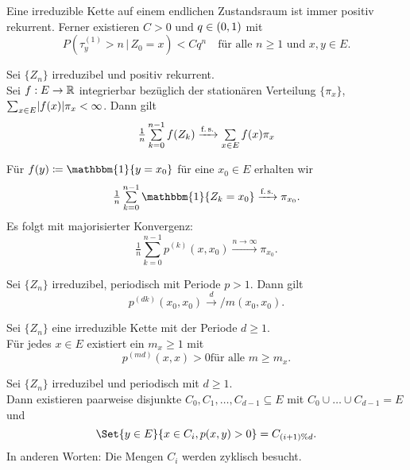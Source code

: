 \documentclass{cheat-sheet}
\newcommand{\ind}{\mathbbm{1}} %
\newcommand{\Defn}[1]{\textcolor{DefinitionColor}{#1}}
\begin{document}

\begin{satz}
  Eine irreduzible Kette auf einem endlichen Zustandsraum ist immer positiv rekurrent.
  Ferner existieren $C > 0$ und $q \in \left( 0, 1 \right)$ mit
  \[
    P(\tau_y^{(1)} > n \,|\, Z_0 = x) < C q^n
    \quad \text{für alle $n \geq 1$ und $x, y \in E$.}
  \]
\end{satz}

\begin{satz}
  Sei $\{ Z_n \}$ irreduzibel und positiv rekurrent. \\
  Sei $f : E \to \mathbb{R}$ integrierbar bezüglich der stationären Verteilung $\{ \pi_x \}$, \dh{} ${\sum}_{x \in E} \abs{f(x)} \pi_x < \infty$.
  Dann gilt
  \[
    \tfrac{1}{n} \sum_{k=0}^{n-1} f(Z_k) \xrightarrow{\text{f.\,s.}} \sum_{x \in E} f(x) \pi_x
  \]
\end{satz}

\begin{bsp}
  Für $f(y) \coloneqq \ind \{ y = x_0 \}$ für eine $x_0 \in E$ erhalten wir
  \[ \tfrac{1}{n} \sum_{k=0}^{n-1} \ind \{ Z_k = x_0 \} \xrightarrow{\text{f.\,s.}} \pi_{x_0}. \]
  Es folgt mit majorisierter Konvergenz:
  \[ \tfrac{1}{n} \sum_{k=0}^{n-1} p^{(k)}(x, x_0) \xrightarrow{n \to \infty} \pi_{x_0}. \]
\end{bsp}

\begin{bsp}
  Sei $\{ Z_n \}$ irreduzibel, periodisch mit Periode $p > 1$.
  Dann gilt
  \[
    p^{(dk)}(x_0, x_0) \xrightarrow d / m(x_0, x_0).
  \]
\end{bsp}

\begin{lem}
  Sei $\{ Z_n \}$ eine irreduzible Kette mit der Periode $d \geq 1$. \\
  Für jedes $x \in E$ existiert ein $m_x \geq 1$ mit
  \[
    p^{(md)}(x, x) > 0
    \text{für alle $m \geq m_x$.}
  \]
\end{lem}


\begin{prop}
  Sei $\{ Z_n \}$ irreduzibel und periodisch mit $d \geq 1$. \\
  Dann existieren paarweise disjunkte $C_0, C_1, \ldots, C_{d-1} \subseteq E$ mit $C_0 \cup \ldots \cup C_{d-1} = E$ und
  \[
    \Set{y \in E}{x \in C_i, p(x, y) > 0} = C_{(i+1) \% d}.
  \]
  In anderen Worten: Die Mengen $C_i$ werden zyklisch besucht.
\end{prop}
\end{document}
